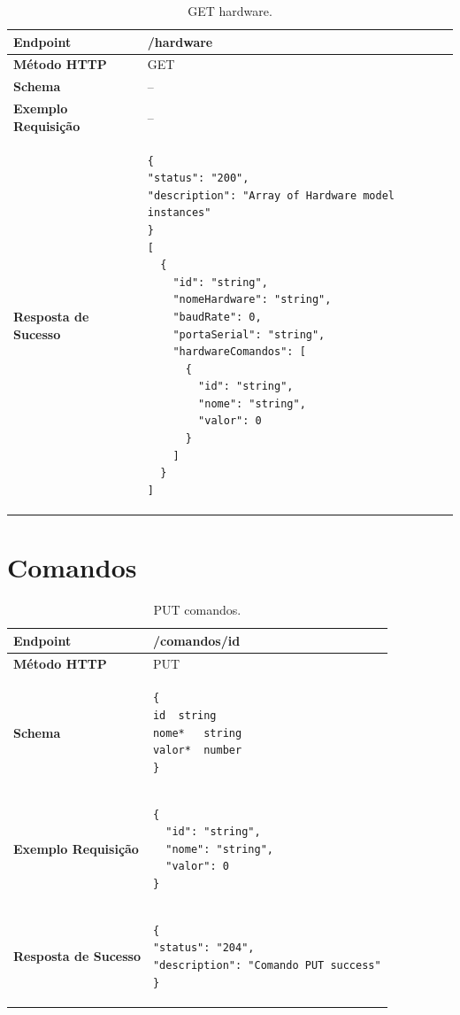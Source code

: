 \begin{apendicesenv}
\begin{table}[H]
\begin{tabular}{|l|l|}
\hline
\textbf{Endpoint}            & /hardware \\ \hline
\textbf{Método HTTP}         & GET \\ \hline
\textbf{Schema}              & -- \\ \hline
\textbf{Exemplo Requisição}  & -- \\ \hline
\textbf{Resposta de Sucesso} & 
\begin{lstlisting}
{
"status": "200",
"description": "Array of Hardware model instances"
}
[
  {
    "id": "string",
    "nomeHardware": "string",
    "baudRate": 0,
    "portaSerial": "string",
    "hardwareComandos": [
      {
        "id": "string",
        "nome": "string",
        "valor": 0
      }
    ]
  }
]
\end{lstlisting}
\\ \hline
\end{tabular}
\caption{GET hardware.}
\label{get_hardware}
\end{table}


\section{Comandos}

\begin{table}[H]
\begin{tabular}{|l|l|}
\hline
\textbf{Endpoint}            & /comandos/{id} \\ \hline
\textbf{Método HTTP}         & PUT \\ \hline
\textbf{Schema}              &  
\begin{lstlisting}
{
id	string
nome*	string
valor*	number
}
\end{lstlisting}\\ \hline
\textbf{Exemplo Requisição}  &  
\begin{lstlisting}
{
  "id": "string",
  "nome": "string",
  "valor": 0
}
\end{lstlisting} \\ \hline
\textbf{Resposta de Sucesso} &
\begin{lstlisting}
{
"status": "204",
"description": "Comando PUT success"
}
\end{lstlisting}
\\ \hline
\end{tabular}
\caption{PUT comandos.}
\label{put_comandos}
\end{table}


\end{apendicesenv}
